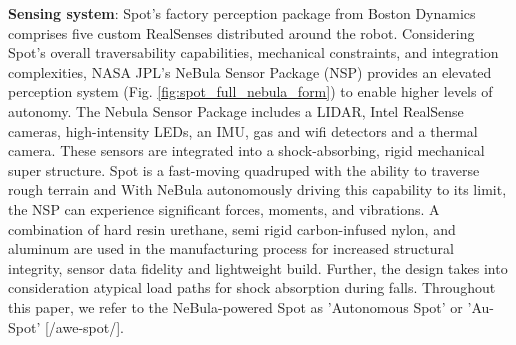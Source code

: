 \documentclass[letterpaper, 10pt, conference]{ieeeconf}      %
\newcommand{\ph}[1]{{\textbf{#1}:}} %
\begin{document}
\ph{Sensing system} 
Spot's factory perception package from Boston Dynamics comprises five custom RealSenses distributed around the robot. Considering Spot’s overall traversability capabilities, mechanical constraints, and integration complexities, NASA JPL's NeBula Sensor Package (NSP) provides %
an elevated perception system (Fig. \ref{fig:spot_full_nebula_form}) to enable higher levels of autonomy. 
The Nebula Sensor Package includes a LIDAR, Intel RealSense cameras, high-intensity LEDs, an IMU, gas and wifi detectors and a thermal camera.
These sensors are integrated into a shock-absorbing, rigid mechanical super structure. 
Spot is a fast-moving quadruped with the ability to traverse rough terrain and With NeBula autonomously driving this capability to its limit, the NSP can experience significant forces, moments, and vibrations. 
A combination of hard resin urethane, semi rigid carbon-infused nylon, and aluminum are used in the manufacturing process for increased structural integrity, sensor data fidelity and lightweight build. 
Further, the design takes into consideration atypical load paths for shock absorption during falls. %
Throughout this paper, we refer to the NeBula-powered Spot as 'Autonomous Spot' or 'Au-Spot' [/awe-spot/]. 
\end{document}
